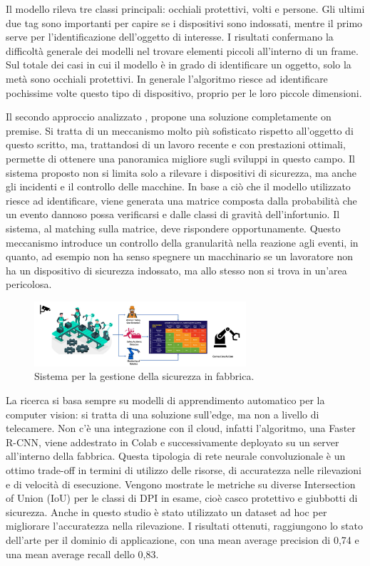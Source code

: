 Il modello rileva tre classi principali: occhiali protettivi, volti e persone. Gli ultimi due tag sono importanti per capire se i dispositivi sono indossati, mentre il primo serve per l'identificazione dell'oggetto di interesse. I risultati confermano la difficoltà generale dei modelli nel trovare elementi piccoli all'interno di un frame. Sul totale dei casi in cui il modello è in grado di identificare un oggetto, solo la metà sono occhiali protettivi. In generale l'algoritmo riesce ad identificare pochissime volte questo tipo di dispositivo, proprio per le loro piccole dimensioni.

Il secondo approccio analizzato \cite{b8safety4}, propone una soluzione completamente on premise. Si tratta di un meccanismo molto più sofisticato rispetto all'oggetto di questo scritto, ma, trattandosi di un lavoro recente e con prestazioni ottimali, permette di ottenere una panoramica migliore sugli sviluppi in questo campo. Il sistema proposto non si limita solo a rilevare i dispositivi di sicurezza, ma anche gli incidenti e il controllo delle macchine. In base a ciò che il modello utilizzato riesce ad identificare, viene generata una matrice composta dalla probabilità che un evento dannoso possa verificarsi e dalle classi di gravità dell'infortunio. Il sistema, al matching sulla matrice, deve rispondere opportunamente. Questo meccanismo introduce un controllo della granularità nella reazione agli eventi, in quanto, ad esempio non ha senso spegnere un macchinario se un lavoratore non ha un dispositivo di sicurezza indossato, ma allo stesso non si trova in un'area pericolosa. 

\begin{figure}[htbp]
    \centering
    \includegraphics[width=0.7\textwidth]{figures/safety-system.png}
    \caption{Sistema per la gestione della sicurezza in fabbrica.}
    \label{fig:safety-system}
\end{figure}

La ricerca si basa sempre su modelli di apprendimento automatico per la computer vision: si tratta di una soluzione sull'edge, ma non a livello di telecamere. Non c'è una integrazione con il cloud, infatti l'algoritmo, una Faster R-CNN, viene addestrato in Colab e successivamente deployato su un server all'interno della fabbrica. Questa tipologia di rete neurale convoluzionale è un ottimo trade-off in termini di utilizzo delle risorse, di accuratezza nelle rilevazioni e di velocità di esecuzione. Vengono mostrate le metriche su diverse Intersection of Union (IoU) per le classi di DPI in esame, cioè casco protettivo e giubbotti di sicurezza. Anche in questo studio è stato utilizzato un dataset ad hoc per migliorare l'accuratezza nella rilevazione. I risultati ottenuti, raggiungono lo stato dell'arte per il dominio di applicazione, con una mean average precision di 0,74 e una mean average recall dello 0,83.

